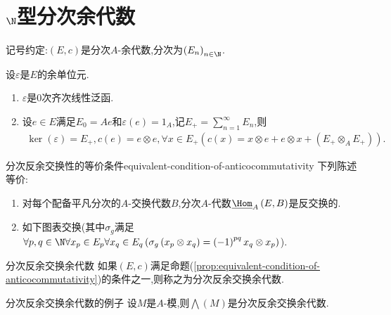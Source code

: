 \section{\texorpdfstring{$\N$}{N}型分次余代数}

记号约定:$\left(E,c\right)$是分次$A$-余代数,分次为$\left(E_{n}\right)_{n\in\N}$.

\begin{proposition}{}{}
	设$\varepsilon$是$E$的余单位元.
	\begin{enumerate}
		\item $\varepsilon$是$0$次齐次线性泛函.
		\item 设$e\in E$满足$E_{0}=Ae$和$\varepsilon\left(e\right)=1_{A}$,记$E_{+}=\sum\limits_{n=1}^{\infty}E_{n}$,则
		\begin{align*}
			\ker\left(\varepsilon\right)=E_{+},c\left(e\right)=e\otimes e,\forall x\in E_{+}\left(c\left(x\right)=x\otimes e+e\otimes x+\left(E_{+}\otimes_{A}E_{+}\right)\right).
		\end{align*}
	\end{enumerate}
\end{proposition}

\begin{proposition}{分次反余交换性的等价条件}{equivalent-condition-of-anticocommutativity}
	下列陈述等价:
	\begin{enumerate}
		\item 对每个配备平凡分次的$A$-交换代数$B$,分次$A$-代数$\underline{\Hom}_{A}\left(E,B\right)$是反交换的.
		\item 如下图表交换(其中$\sigma_{g}$满足$\forall p,q\in\N\forall x_{p}\in E_{p}\forall x_{q}\in E_{q}\left(\sigma_{g}\left(x_{p}\otimes x_{q}\right)=\left(-1\right)^{pq}x_{q}\otimes x_{p}\right)$).
		\begin{center}
		\end{center}
	\end{enumerate}
\end{proposition}

\begin{definition}{分次反余交换余代数}{}
	如果$\left(E,c\right)$满足命题(\ref{prop:equivalent-condition-of-anticocommutativity})的条件之一,则称之为分次反余交换余代数.
\end{definition}

\begin{example}{分次反余交换余代数的例子}{}
	设$M$是$A$-模,则$\bigwedge\left(M\right)$是分次反余交换余代数.
\end{example}
